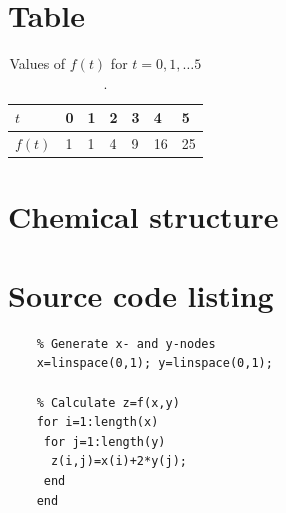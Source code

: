 \section{Table}
    \begin{table}[H]
        \centering
        \caption{Values of $f(t)$ for $t=0,1,\dots 5$.}
        \begin{tabular}{l|llllll} \hline\hline
            $t$ & 0 & 1 & 2 & 3 & 4 & 5 \\ \hline
            $f(t)$ & 1 & 1 & 4 & 9 & 16 & 25 \\ \hline\hline
        \end{tabular}
    \end{table}

\section{Chemical structure}
    \begin{center}
    \end{center}


\section{Source code listing}
\begin{verbatim}
    % Generate x- and y-nodes
    x=linspace(0,1); y=linspace(0,1);
    
    % Calculate z=f(x,y)
    for i=1:length(x)
     for j=1:length(y)
      z(i,j)=x(i)+2*y(j);
     end
    end
\end{verbatim}
